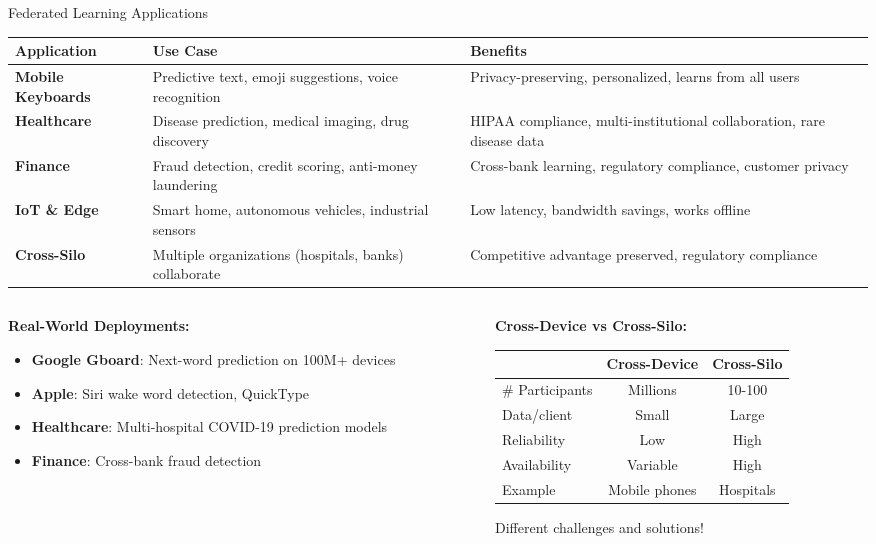 \begin{frame}{Federated Learning Applications}
\begin{table}
\centering
\small
\begin{tabular}{p{3cm}p{4.5cm}p{3.5cm}}
\toprule
\textbf{Application} & \textbf{Use Case} & \textbf{Benefits} \\
\midrule
\textbf{Mobile Keyboards} & Predictive text, emoji suggestions, voice recognition & Privacy-preserving, personalized, learns from all users \\
\midrule
\textbf{Healthcare} & Disease prediction, medical imaging, drug discovery & HIPAA compliance, multi-institutional collaboration, rare disease data \\
\midrule
\textbf{Finance} & Fraud detection, credit scoring, anti-money laundering & Cross-bank learning, regulatory compliance, customer privacy \\
\midrule
\textbf{IoT \& Edge} & Smart home, autonomous vehicles, industrial sensors & Low latency, bandwidth savings, works offline \\
\midrule
\textbf{Cross-Silo} & Multiple organizations (hospitals, banks) collaborate & Competitive advantage preserved, regulatory compliance \\
\bottomrule
\end{tabular}
\end{table}

\begin{columns}
\begin{column}{0.5\textwidth}
\textbf{Real-World Deployments:}
\begin{itemize}
\item \textbf{Google Gboard}: Next-word prediction on 100M+ devices
\item \textbf{Apple}: Siri wake word detection, QuickType
\item \textbf{Healthcare}: Multi-hospital COVID-19 prediction models
\item \textbf{Finance}: Cross-bank fraud detection
\end{itemize}
\end{column}
\begin{column}{0.5\textwidth}
\textbf{Cross-Device vs Cross-Silo:}

\begin{table}
\centering
\tiny
\begin{tabular}{lcc}
\toprule
& \textbf{Cross-Device} & \textbf{Cross-Silo} \\
\midrule
\# Participants & Millions & 10-100 \\
Data/client & Small & Large \\
Reliability & Low & High \\
Availability & Variable & High \\
Example & Mobile phones & Hospitals \\
\bottomrule
\end{tabular}
\end{table}

Different challenges and solutions!
\end{column}
\end{columns}
\end{frame}

